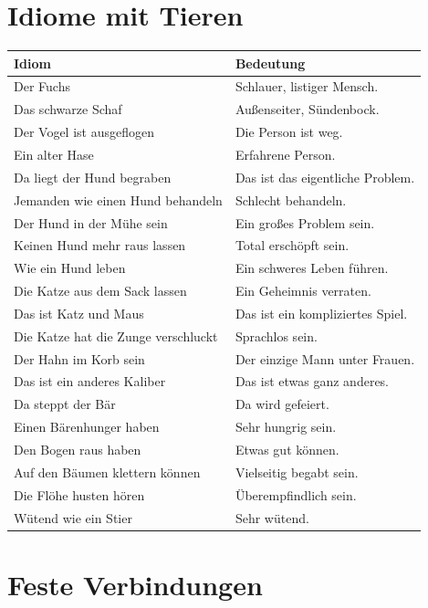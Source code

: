 \section{Idiome mit Tieren}
\label{sec:Tiere}

\bigskip
\begin{center}
\begin{tabular}{|l|p{8cm}|}
\hline
Idiom & Bedeutung \\ \hline
Der Fuchs & Schlauer, listiger Mensch. \\ \hline
Das schwarze Schaf & Außenseiter, Sündenbock. \\ \hline
Der Vogel ist ausgeflogen & Die Person ist weg. \\ \hline
Ein alter Hase & Erfahrene Person. \\ \hline
Da liegt der Hund begraben & Das ist das eigentliche Problem. \\ \hline
Jemanden wie einen Hund behandeln & Schlecht behandeln. \\ \hline
Der Hund in der Mühe sein & Ein großes Problem sein. \\ \hline
Keinen Hund mehr raus lassen & Total erschöpft sein. \\ \hline
Wie ein Hund leben & Ein schweres Leben führen. \\ \hline
Die Katze aus dem Sack lassen & Ein Geheimnis verraten. \\ \hline
Das ist Katz und Maus & Das ist ein kompliziertes Spiel. \\ \hline
Die Katze hat die Zunge verschluckt & Sprachlos sein. \\ \hline
Der Hahn im Korb sein & Der einzige Mann unter Frauen. \\ \hline
Das ist ein anderes Kaliber & Das ist etwas ganz anderes. \\ \hline
Da steppt der Bär & Da wird gefeiert. \\ \hline
Einen Bärenhunger haben & Sehr hungrig sein. \\ \hline
Den Bogen raus haben & Etwas gut können. \\ \hline
Auf den Bäumen klettern können & Vielseitig begabt sein. \\ \hline
Die Flöhe husten hören & Überempfindlich sein. \\ \hline
Wütend wie ein Stier & Sehr wütend. \\ \hline
\end{tabular}
\end{center}

\section{Feste Verbindungen}
\label{sec:FesteVerbindungen}

